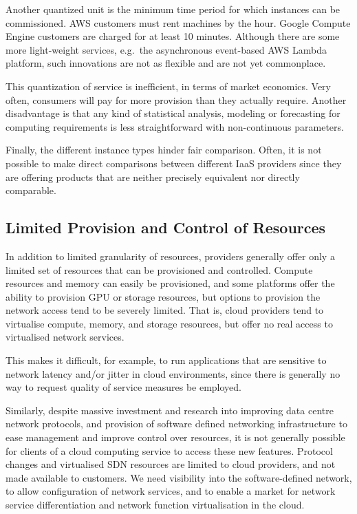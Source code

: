 \documentclass[conference,10pt]{IEEEtran}
\begin{document}
Another quantized unit is the minimum time period for which instances can be commissioned. AWS customers must rent machines by the hour. Google Compute Engine customers are charged for at least 10 minutes.
Although there are some more light-weight services, e.g.\ the asynchronous event-based AWS Lambda platform, such innovations are not as flexible and are not yet commonplace.

This quantization of service is inefficient, in terms of market economics. Very often, consumers will pay for more provision than they actually require. Another disadvantage is that any kind of statistical analysis, modeling or forecasting for computing requirements is less straightforward with non-continuous parameters. 

Finally, the different instance types hinder fair comparison. Often, it is not possible to make direct comparisons between different IaaS providers since they are offering products that are neither precisely equivalent nor directly comparable.


\subsection{Limited Provision and Control of Resources}

In addition to limited granularity of resources, providers generally offer
only a limited set of resources that can be provisioned and controlled. 
Compute resources and memory can easily be provisioned, and some platforms
offer the ability to provision GPU or storage resources, but options to
provision the network access tend to be severely limited. That is, cloud
providers tend to virtualise compute, memory, and storage resources, but
offer no real access to virtualised network services. 

This makes it difficult, for example, to run applications that are
sensitive to network latency and/or jitter in cloud environments, since
there is generally no way to request quality of service measures be
employed. 

Similarly, despite massive investment and research into improving data
centre network protocols, and provision of software defined networking
infrastructure to ease management and improve control over resources, 
it is not generally possible for clients of a cloud computing service
to access these new features. Protocol changes and virtualised SDN 
resources are limited to cloud providers, and not made available to
customers. We need visibility into the software-defined network, to
allow configuration of network services, and to enable a market for
network service differentiation and network function virtualisation
in the cloud. 
\end{document}
